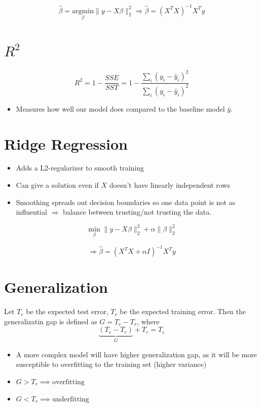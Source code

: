 \documentclass{article}
\begin{document}
\[
\hat{\beta} = \underset{\beta}{\text{argmin}} \|y - X\beta\|_2^2 \Rightarrow \hat{\beta} = (X^T X)^{-1} X^T y
\]

\section*{$R^2$}

\[
R^2 = 1 - \frac{SSE}{SST} = 1 - \frac{\sum_i (y_i - \hat{y}_i)^2}{\sum_i (y_i - \bar{y}_i)^2}
\]

\begin{itemize}
    \item Measures how well our model does compared to the baseline model $\bar{y}$.
\end{itemize}

\section*{Ridge Regression}

\begin{itemize}
    \item Adds a L2-regularizer to smooth training
    \item Can give a solution even if $X$ doesn't have linearly independent rows
    \item Smoothing spreads out decision boundaries so one data point is not as influential $\Rightarrow$ balance between trusting/not trusting the data.
\end{itemize}

\[
\min_{\beta} \|y - X\beta\|_2^2 + \alpha \|\beta\|_2^2
\]

\[
\Rightarrow \hat{\beta} = (X^T X + \alpha I)^{-1} X^T y
\]

\section*{Generalization}
Let $T_e$ be the expected test error, $T_r$ be the expected training error.
Then the generalizatin gap is defined as $G = T_e - T_r$, where 
\[
    \underbrace{(T_e - T_r)}_G + T_r = T_e
\]

\begin{itemize}
    \item A more complex model will have higher generalization gap, as it will be more susceptible to overfitting to the training set (higher variance)
    \item $G > T_r \implies \text{overfitting}$
    \item $G < T_r \implies \text{underfitting}$
\end{itemize}
\end{document}
